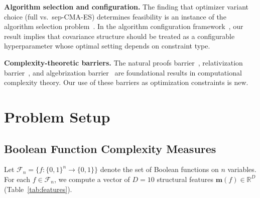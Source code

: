 \documentclass[twoside,11pt]{article}
\newcommand{\R}{\mathbb{R}}
\newcommand{\calF}{\mathcal{F}}
\begin{document}
\textbf{Algorithm selection and configuration.}
The finding that optimizer variant choice (full vs.\ sep-CMA-ES) determines
feasibility is an instance of the algorithm selection
problem~\citep{rice1976algorithm,xu2008satzilla}. In the algorithm
configuration framework~\citep{hutter2011smac,lindauer2022smac3}, our result
implies that covariance structure should be treated as a configurable
hyperparameter whose optimal setting depends on constraint type.

\textbf{Complexity-theoretic barriers.}
The natural proofs barrier~\citep{razborov1997natural}, relativization
barrier~\citep{baker1975relativizations}, and algebrization
barrier~\citep{aaronson2008algebrization} are foundational results in
computational complexity theory. Our use of these barriers as optimization
constraints is new.

\section{Problem Setup}
\label{sec:setup}

\subsection{Boolean Function Complexity Measures}

Let $\calF_n = \{f : \{0,1\}^n \to \{0,1\}\}$ denote the set of Boolean functions
on $n$ variables. For each $f \in \calF_n$, we compute a vector of $D=10$
structural features $\mathbf{m}(f) \in \R^D$ (Table~\ref{tab:features}).
\end{document}
